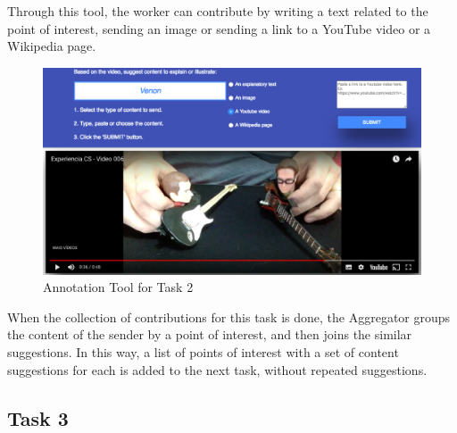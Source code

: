 
Through this tool, the worker can contribute by writing a text related to the point of interest, sending an image or sending a link to a YouTube video or a Wikipedia page.


\begin{figure}[h!]
	\centerline{\includegraphics[scale=0.20] {figure/task_2_new}}
	\caption{Annotation Tool for Task 2}
	\label{task_2}
\end{figure}

When the collection of contributions for this task is done, the Aggregator groups the content of the sender by a point of interest, and then joins the similar suggestions. In this way, a list of points of interest with a set of content suggestions for each is added to the next task, without repeated suggestions.



\subsection{Task 3}

